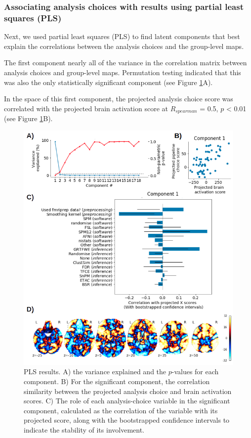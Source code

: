 \documentclass[a4paper,doc,natbib]{apa6}
\begin{document}
\subsubsection{Associating analysis choices with results using partial least squares (PLS)}
Next, we used partial least squares (PLS) to find latent components that best explain the correlations between the analysis choices and the group-level maps. 

The first component nearly all of the variance in the correlation matrix between analysis choices and group-level maps. Permutation testing indicated that this was also the only statistically significant component (see Figure \ref{fig:pls_results}A). 

In the space of this first component, the projected analysis choice score was correlated with the projected brain activation score at $R_{spearman}$ = 0.5, $p$ < 0.01 (see Figure \ref{fig:pls_results}B).

\begin{figure}[!htb]
	\includegraphics[width=\textwidth]{figures/results1_PLS_all.png}
	\caption{\label{fig:pls_results} PLS results. A) the variance explained and the $p$-values for each component. B) For the significant component, the correlation similarity between the projected analysis choice and brain activation scores. C) The role of each analysis-choice variable in the significant component, calculated as the correlation of the variable with its projected score, along with the bootstrapped confidence intervals to indicate the stability of its involvement.}

\end{figure}
\end{document}
